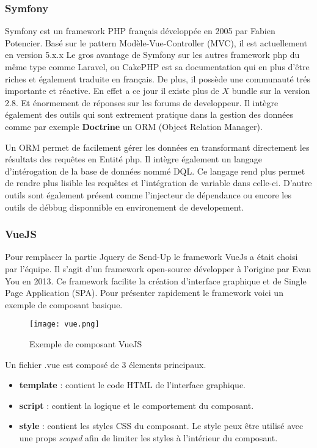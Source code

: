 \subsubsection{Symfony}
Symfony\cite{symfony} est un framework PHP français développée en 2005 par Fabien Potencier. Basé sur le pattern Modèle-Vue-Controller (MVC), il est actuellement en version 5.x.x  Le gros avantage de Symfony sur les autres framework php du même type comme Laravel, ou CakePHP est sa documentation qui en plus d'être riches et également traduite en français. De plus, il possède une communauté trés importante et réactive. En effet a ce jour il existe plus de $X$ bundle sur la version 2.8. Et énormement de réponses sur les forums de developpeur. Il intègre également des outils qui sont extrement pratique dans la gestion des données comme par exemple \textbf{Doctrine}\cite{doctrine} un ORM (Object Relation Manager).

Un ORM permet de facilement gérer les données en transformant directement les résultats des requêtes en Entité php. Il intègre également un langage d'intérogation de la base de données nommé DQL. Ce langage rend plus permet de rendre plus lisible les requêtes et l'intégration de variable dans celle-ci. D'autre outils sont également présent comme l'injecteur de dépendance ou encore les outils de débbug disponnible en environement de developement.  


\subsubsection{VueJS}
Pour remplacer la partie Jquery de Send-Up le framework VueJs\cite{vue} a était choisi par l'équipe. Il s'agit d'un framework open-source développer à l'origine par Evan You en 2013. Ce framework facilite la création d'interface graphique et de Single Page Application (SPA). Pour présenter rapidement le framework voici un exemple de composant basique. 

\begin{figure}[htbp]
    \center
    \texttt{[image: vue.png]}
    \caption{Exemple de composant VueJS}
\end{figure}

Un fichier .vue est composé de 3 élements principaux.
\begin{itemize}
    \item \textbf{template} : contient le code HTML de l'interface graphique.
    \item \textbf{script} : contient la logique et le comportement du composant. 
    \item \textbf{style} : contient les styles CSS du composant. Le style peux être utilisé avec une props \textit{scoped} afin de limiter les styles à l'intérieur du composant.
\end{itemize}

